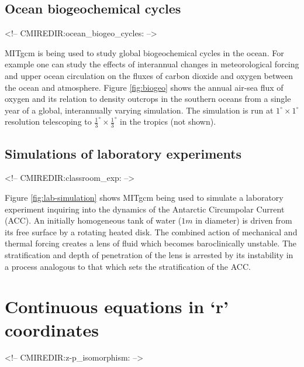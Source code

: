 \subsection{Ocean biogeochemical cycles}
\begin{rawhtml}
<!-- CMIREDIR:ocean_biogeo_cycles: -->
\end{rawhtml}

MITgcm is being used to study global biogeochemical cycles in the ocean. For
example one can study the effects of interannual changes in meteorological
forcing and upper ocean circulation on the fluxes of carbon dioxide and
oxygen between the ocean and atmosphere. Figure \ref{fig:biogeo} shows 
the annual air-sea flux of oxygen and its relation to density outcrops in 
the southern oceans from a single year of a global, interannually varying 
simulation. The simulation is run at $1^{\circ}\times1^{\circ}$ resolution
telescoping to $\frac{1}{3}^{\circ}\times\frac{1}{3}^{\circ}$ in the tropics (not shown).



\subsection{Simulations of laboratory experiments}
\begin{rawhtml}
<!-- CMIREDIR:classroom_exp: -->
\end{rawhtml}

Figure \ref{fig:lab-simulation} shows MITgcm being used to simulate a 
laboratory experiment inquiring into the dynamics of the Antarctic Circumpolar Current (ACC). An
initially homogeneous tank of water ($1m$ in diameter) is driven from its
free surface by a rotating heated disk. The combined action of mechanical
and thermal forcing creates a lens of fluid which becomes baroclinically
unstable. The stratification and depth of penetration of the lens is
arrested by its instability in a process analogous to that which sets the
stratification of the ACC.




\section{Continuous equations in `r' coordinates}
\begin{rawhtml}
<!-- CMIREDIR:z-p_isomorphism: -->
\end{rawhtml}

